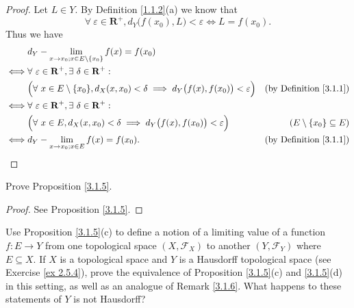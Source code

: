 \begin{proof}
    Let \(L \in Y\).
    By Definition \ref{1.1.2}(a) we know that
    \[
        \forall\ \varepsilon \in \mathbf{R}^+, d_Y\big(f(x_0), L\big) < \varepsilon \iff L = f(x_0).
    \]
    Thus we have
    \begin{align*}
             & d_Y - \lim_{x \to x_0 ; x \in E \setminus \{x_0\}} f(x) = f(x_0)                                                                                         \\
        \iff & \forall\ \varepsilon \in \mathbf{R}^+, \exists\ \delta \in \mathbf{R}^+ :                                                                                \\
             & \Big(\forall\ x \in E \setminus \{x_0\}, d_X(x, x_0) < \delta \implies d_Y\big(f(x), f(x_0)\big) < \varepsilon\Big) & \text{(by Definition \ref{3.1.1})} \\
        \iff & \forall\ \varepsilon \in \mathbf{R}^+, \exists\ \delta \in \mathbf{R}^+ :                                                                                \\
             & \Big(\forall\ x \in E, d_X(x, x_0) < \delta \implies d_Y\big(f(x), f(x_0)\big) < \varepsilon\Big)                   & (E \setminus \{x_0\} \subseteq E)  \\
        \iff & d_Y - \lim_{x \to x_0 ; x \in E} f(x) = f(x_0).                                                                     & \text{(by Definition \ref{3.1.1})}
    \end{align*}
\end{proof}

\begin{exercise}\label{ex 3.1.2}
    Prove Proposition \ref{3.1.5}.
\end{exercise}

\begin{proof}
    See Proposition \ref{3.1.5}.
\end{proof}

\begin{exercise}\label{ex 3.1.3}
    Use Proposition \ref{3.1.5}(c) to define a notion of a limiting value of a function \(f : E \to Y\) from one topological space \((X, \mathcal{F}_X)\) to another \((Y, \mathcal{F}_Y)\) where \(E \subseteq X\).
    If \(X\) is a topological space and \(Y\) is a Hausdorff topological space (see Exercise \ref{ex 2.5.4}), prove the equivalence of Proposition \ref{3.1.5}(c) and \ref{3.1.5}(d) in this setting, as well as an analogue of Remark \ref{3.1.6}.
    What happens to these statements of \(Y\) is not Hausdorff?
\end{exercise}

